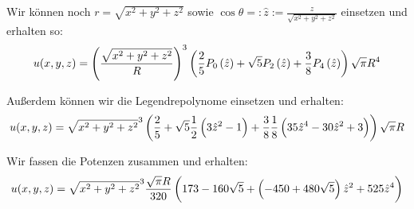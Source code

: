 Wir können noch $r = \sqrt{x^2+y^2+z^2}$ sowie $\cos \theta =: \hat z :=
\frac{z}{\sqrt{x^2+y^2+z^2}}$ einsetzen und erhalten so:
\[
	u(x, y, z) = \del{\frac{\sqrt{x^2+y^2+z^2}}R}^3
					   \del{\frac 25 P_0\del{\hat z} + \sqrt{5} P_2\del{\hat z} + \frac{3}{8} P_4\del{\hat z}}
		   \sqrt{\pi} R^4
\]

Außerdem können wir die Legendrepolynome einsetzen und erhalten:
\[
	u(x, y, z) = \sqrt{x^2+y^2+z^2}^3
	\del{\frac 25 + \sqrt{5} \half \del{3 \hat z^2-1} + \frac{3}{8} \frac 18 \del{35 \hat z^4 - 30 \hat z^2 + 3}}
		   \sqrt{\pi} R
\]

Wir fassen die Potenzen zusammen und erhalten:
\[
	u(x, y, z) = \sqrt{x^2+y^2+z^2}^3
		   \frac{\sqrt{\pi} R}{320} \del{173- 160 \sqrt{5} + \del{- 450 + 480 \sqrt{5}} \hat z^2 + 525 \hat z^4}
\]



%
%



